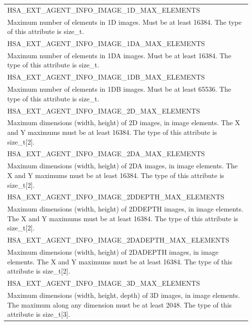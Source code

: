 \documentclass[final,oneside]{book}
\newcommand{\reftyp}[1]{#1}
\newcommand{\refenu}[1]{\reftyp{#1}}
\begin{document}
\begin{longtable}{@{\hspace{2em}}p{\linewidth-2em}}
\hspace{-2em}\refenu{HSA_\-EXT_\-AGENT_\-INFO_\-IMAGE_\-1D_\-MAX_\-ELEMENTS}\\Maximum number of elements in 1D images. Must be at least 16384. The type of this attribute is size_\-t.\\[2mm]
\hspace{-2em}\refenu{HSA_\-EXT_\-AGENT_\-INFO_\-IMAGE_\-1DA_\-MAX_\-ELEMENTS}\\Maximum number of elements in 1DA images. Must be at least 16384. The type of this attribute is size_\-t.\\[2mm]
\hspace{-2em}\refenu{HSA_\-EXT_\-AGENT_\-INFO_\-IMAGE_\-1DB_\-MAX_\-ELEMENTS}\\Maximum number of elements in 1DB images. Must be at least 65536. The type of this attribute is size_\-t.\\[2mm]
\hspace{-2em}\refenu{HSA_\-EXT_\-AGENT_\-INFO_\-IMAGE_\-2D_\-MAX_\-ELEMENTS}\\Maximum dimensions (width, height) of 2D images, in image elements. The X and Y maximums must be at least 16384. The type of this attribute is size_\-t[2].\\[2mm]
\hspace{-2em}\refenu{HSA_\-EXT_\-AGENT_\-INFO_\-IMAGE_\-2DA_\-MAX_\-ELEMENTS}\\Maximum dimensions (width, height) of 2DA images, in image elements. The X and Y maximums must be at least 16384. The type of this attribute is size_\-t[2].\\[2mm]
\hspace{-2em}\refenu{HSA_\-EXT_\-AGENT_\-INFO_\-IMAGE_\-2DDEPTH_\-MAX_\-ELEMENTS}\\Maximum dimensions (width, height) of 2DDEPTH images, in image elements. The X and Y maximums must be at least 16384. The type of this attribute is size_\-t[2].\\[2mm]
\hspace{-2em}\refenu{HSA_\-EXT_\-AGENT_\-INFO_\-IMAGE_\-2DADEPTH_\-MAX_\-ELEMENTS}\\Maximum dimensions (width, height) of 2DADEPTH images, in image elements. The X and Y maximums must be at least 16384. The type of this attribute is size_\-t[2].\\[2mm]
\hspace{-2em}\refenu{HSA_\-EXT_\-AGENT_\-INFO_\-IMAGE_\-3D_\-MAX_\-ELEMENTS}\\Maximum dimensions (width, height, depth) of 3D images, in image elements. The maximum along any dimension must be at least 2048. The type of this attribute is size_\-t[3].\\[2mm]

\end{longtable}
\end{document}
